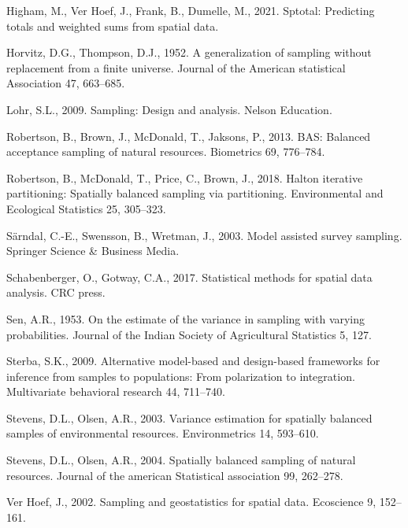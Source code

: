 \documentclass[]{elsarticle} %
\begin{document}
\leavevmode\hypertarget{ref-higham2021sptotal}{}%
Higham, M., Ver Hoef, J., Frank, B., Dumelle, M., 2021. Sptotal:
Predicting totals and weighted sums from spatial data.

\leavevmode\hypertarget{ref-horvitz1952generalization}{}%
Horvitz, D.G., Thompson, D.J., 1952. A generalization of sampling
without replacement from a finite universe. Journal of the American
statistical Association 47, 663--685.

\leavevmode\hypertarget{ref-lohr2009sampling}{}%
Lohr, S.L., 2009. Sampling: Design and analysis. Nelson Education.

\leavevmode\hypertarget{ref-robertson2013bas}{}%
Robertson, B., Brown, J., McDonald, T., Jaksons, P., 2013. BAS: Balanced
acceptance sampling of natural resources. Biometrics 69, 776--784.

\leavevmode\hypertarget{ref-robertson2018halton}{}%
Robertson, B., McDonald, T., Price, C., Brown, J., 2018. Halton
iterative partitioning: Spatially balanced sampling via partitioning.
Environmental and Ecological Statistics 25, 305--323.

\leavevmode\hypertarget{ref-sarndal2003model}{}%
Särndal, C.-E., Swensson, B., Wretman, J., 2003. Model assisted survey
sampling. Springer Science \& Business Media.

\leavevmode\hypertarget{ref-schabenberger2017statistical}{}%
Schabenberger, O., Gotway, C.A., 2017. Statistical methods for spatial
data analysis. CRC press.

\leavevmode\hypertarget{ref-sen1953estimate}{}%
Sen, A.R., 1953. On the estimate of the variance in sampling with
varying probabilities. Journal of the Indian Society of Agricultural
Statistics 5, 127.

\leavevmode\hypertarget{ref-sterba2009alternative}{}%
Sterba, S.K., 2009. Alternative model-based and design-based frameworks
for inference from samples to populations: From polarization to
integration. Multivariate behavioral research 44, 711--740.

\leavevmode\hypertarget{ref-stevens2003variance}{}%
Stevens, D.L., Olsen, A.R., 2003. Variance estimation for spatially
balanced samples of environmental resources. Environmetrics 14,
593--610.

\leavevmode\hypertarget{ref-stevens2004spatially}{}%
Stevens, D.L., Olsen, A.R., 2004. Spatially balanced sampling of natural
resources. Journal of the american Statistical association 99, 262--278.

\leavevmode\hypertarget{ref-verhoef2002sampling}{}%
Ver Hoef, J., 2002. Sampling and geostatistics for spatial data.
Ecoscience 9, 152--161.
\end{document}
